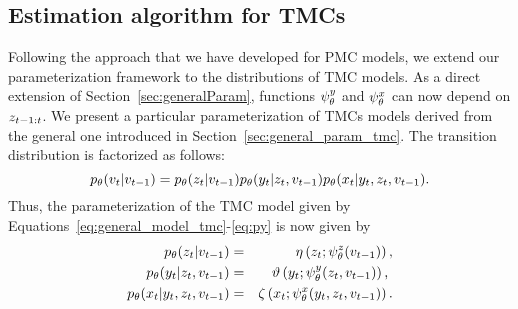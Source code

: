 \subsection{Estimation algorithm for TMCs}
Following the approach that we have developed for PMC models, 
we extend our parameterization framework to the 
distributions of TMC models. 
As a direct extension of Section~\ref{sec:generalParam}, functions $\psi^{y}_{\theta}$ and
$\psi^{x}_{\theta}$ can now depend on $z_{t-1:t}$. 
We present a particular parameterization of TMCs models derived from the general one
introduced in Section~\ref{sec:general_param_tmc}.
The transition distribution is factorized as follows:
\begin{equation}
  \label{tmc-trans}
    p_{\theta}({v}_t|{v}_{t-1})=p_{\theta}(z_t|{v}_{t-1})p_{\theta}(y_t|z_t,{v}_{t-1})p_{\theta}(x_t|y_t,z_t,{v}_{t-1})
    \text{.}
\end{equation} 
Thus, the parameterization of the TMC model
given by Equations~\eqref{eq:general_model_tmc}-\eqref{eq:py}
is now given by
\begin{eqnarray}
  \label{tmc-theta-1}
  p_{\theta}(z_t|{v}_{t-1}) &=& \eta \left(z_t; \psi^{z}_{\theta}({v}_{t-1})\right) \text{,}\\
  \label{tmc-theta-2}
  p_{\theta}(y_t| z_{t},{v}_{t-1})&=&\vartheta \left(y_t;\psi^{y}_{\theta}(z_{t},{v}_{t-1})\right) \text{, } \\
  \label{tmc-theta-3}
  p_{\theta}(x_t|y_t, z_{t},{v}_{t-1})&=&\zeta\left(x_t;\psi^{x}_{\theta}(y_t, z_{t},{v}_{t-1})\right) \text{.}
\end{eqnarray}
